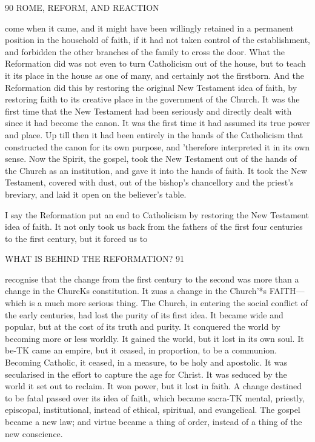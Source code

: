 \documentclass[12pt,a5paper,oneside]{book}
\begin{document}
90 ROME, REFORM, AND REACTION 

come when it came, and it might have been willingly 
retained in a permanent position in the household of 
faith, if it had not taken control of the establishment, 
and forbidden the other branches of the family to 
cross the door. What the Reformation did was not 
even to turn Catholicism out of the house, but to 
teach it its place in the house as one of many, and 
certainly not the firstborn. And the Reformation did 
this by restoring the original New Testament idea of 
faith, by restoring faith to its creative place in the 
government of the Church. It was the first time 
that the New Testament had been seriously and 
directly dealt with since it had become the canon. It 
was the first time it had assumed its true power and 
place. Up till then it had been entirely in the hands 
of the Catholicism that constructed the canon for its 
own purpose, and 'therefore interpreted it in its own 
sense. Now the Spirit, the gospel, took the New 
Testament out of the hands of the Church as an 
institution, and gave it into the hands of faith. It 
took the New Testament, covered with dust, out of 
the bishop's chancellory and the priest's breviary, and 
laid it open on the believer's table. 

I say the Reformation put an end to Catholicism 
by restoring the New Testament idea of faith. It 
not only took us back from the fathers of the first 
four centuries to the first century, but it forced us to 



WHAT IS BEHIND THE REFORMATION? 91 

recognise that the change from the first century to the 
second was more than a change in the ChurcKs constitution. 
It zuas a change in the Church'*s FAITH---which is a 
much more serious thing. The Church, in entering 
the social conflict of the early centuries, had lost the 
purity of its first idea. It became wide and popular, 
but at the cost of its truth and purity. It conquered 
the world by becoming more or less worldly. It 
gained the world, but it lost in its own soul. It be-TK
came an empire, but it ceased, in proportion, to be 
a communion. Becoming Catholic, it ceased, in a 
measure, to be holy and apostolic. It was secularised 
in the effort to capture the age for Christ. It was 
seduced by the world it set out to reclaim. It won 
power, but it lost in faith. A change destined to be 
fatal passed over its idea of faith, which became sacra-TK
mental, priestly, episcopal, institutional, instead of 
ethical, spiritual, and evangelical. The gospel became 
a new law; and virtue became a thing of order, 
instead of a thing of the new conscience. 
\end{document}
